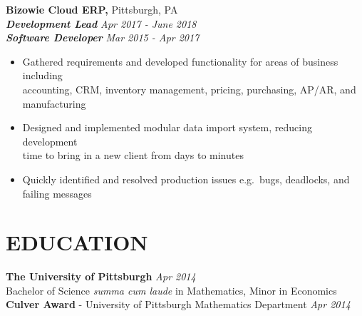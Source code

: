 \documentclass[]{resume}
\newcommand\tab[1][.5cm]{\hspace*{#1}}
\begin{document}
\begin{resume}

\textbf{\large Bizowie Cloud ERP,} {\large Pittsburgh, PA}\\
\tab\textbf{\textit{Development Lead}} \hfill \textit{Apr 2017 - June 2018}\\
\tab \textbf{\textit{Software Developer}}  \hfill \textit{Mar 2015 - Apr 2017}
\begin{itemize}
    \item
    Gathered requirements and developed functionality for areas of business including \\
    accounting, CRM, inventory management, pricing, purchasing, AP/AR, and manufacturing
    \item
    Designed and implemented modular data import system, reducing development \\
    time to bring in a new client from days to minutes
    \item 
    Quickly identified and resolved production issues e.g.\ bugs, deadlocks, and failing messages
\end{itemize}


\section{EDUCATION\makebox[372 px]{\rule[.5 ex]{372 px}{1.0pt}}}
\vspace{0.9mm}
\textbf{\large The University of Pittsburgh} \hfill \textit{Apr 2014}\vspace{0.7mm}\\ 
\hspace*{4mm}Bachelor of Science \emph{summa cum laude} in Mathematics, Minor in Economics\\ %
\textbf{Culver Award}  - University of Pittsburgh Mathematics Department  \hfill \textit{Apr 2014}\vspace{0.7mm}\clearpage
\end{resume}
\end{document}
